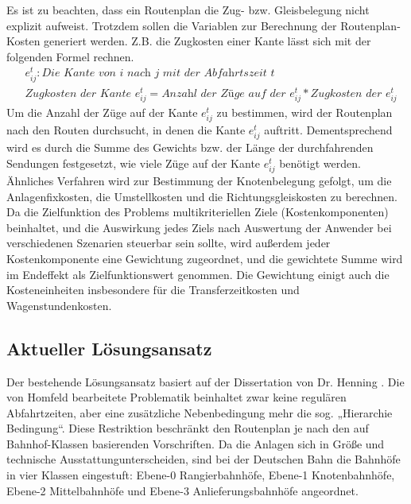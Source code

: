 Es ist zu beachten, dass ein Routenplan die Zug- bzw. Gleisbelegung nicht explizit aufweist. Trotzdem sollen die Variablen zur Berechnung der Routenplan-Kosten generiert werden. Z.B. die Zugkosten einer Kante lässt sich mit der folgenden Formel rechnen.
\begin{equation*}
    \begin{aligned}
        & e_{ij}^t : \textit{Die Kante von i nach j mit der Abfahrtszeit t} \\
        & \textit{Zugkosten der Kante } e_{ij}^t  = \textit{Anzahl der Züge auf der } e_{ij}^t * \textit{Zugkosten der } e_{ij}^t
    \end{aligned}
\end{equation*}
Um die Anzahl der Züge auf der Kante $e_{ij}^t$ zu bestimmen, wird der Routenplan nach den Routen durchsucht, in denen die Kante $e_{ij}^t$ auftritt. Dementsprechend wird es durch die Summe des Gewichts bzw. der Länge der durchfahrenden Sendungen festgesetzt, wie viele Züge auf der Kante $e_{ij}^t$ benötigt werden. Ähnliches Verfahren wird zur Bestimmung der Knotenbelegung gefolgt, um die Anlagenfixkosten, die Umstellkosten und die Richtungsgleiskosten zu berechnen.\\

Da die Zielfunktion des Problems multikriteriellen Ziele (Kostenkomponenten) beinhaltet, und die Auswirkung jedes Ziels nach Auswertung der Anwender bei verschiedenen Szenarien steuerbar sein sollte, wird außerdem jeder Kostenkomponente eine Gewichtung zugeordnet, und die gewichtete Summe wird im Endeffekt als Zielfunktionswert genommen. Die Gewichtung einigt auch die Kosteneinheiten insbesondere für die Transferzeitkosten und Wagenstundenkosten.

\subsection{Aktueller Lösungsansatz}
\label{sec:current}
Der bestehende Lösungsansatz basiert auf der Dissertation von Dr. Henning \cite{homfeld2012consolidating}. Die von Homfeld bearbeitete Problematik beinhaltet zwar keine regulären Abfahrtzeiten, aber eine zusätzliche Nebenbedingung mehr die sog. „Hierarchie Bedingung“. Diese Restriktion beschränkt den Routenplan je nach den auf Bahnhof-Klassen basierenden Vorschriften. Da die Anlagen sich in Größe und technische Ausstattungunterscheiden, sind bei der Deutschen Bahn die Bahnhöfe in vier Klassen eingestuft: Ebene-0 Rangierbahnhöfe, Ebene-1 Knotenbahnhöfe, Ebene-2 Mittelbahnhöfe und Ebene-3 Anlieferungsbahnhöfe angeordnet.\\

